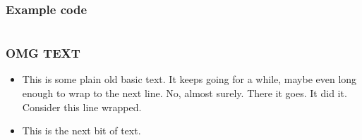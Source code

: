 \documentclass{beamer}
\begin{document}
\begin{frame}[fragile]
  \frametitle{Example code}
  \footnotesize{\inputminted{rust}{code.rs}}
\end{frame}

\begin{frame}[fragile]
  \frametitle{OMG TEXT}

  \begin{itemize}
    \item This is some plain old basic text. It keeps going for a while, maybe
      even long enough to wrap to the next line. No, almost surely. There it
      goes. It did it. Consider this line wrapped.

    \item This is the next bit of text.

  \end{itemize}
\end{frame}
\end{document}
